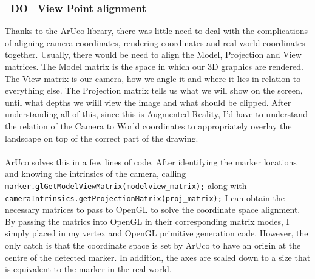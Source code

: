 \documentclass[11pt]{article}
\begin{document}
\subsubsection{~DO~ View Point alignment}
Thanks to the ArUco library, there was little need to deal with the
complications of aligning camera coordinates, rendering coordinates
and real-world coordinates together. Usually, there would be
need to align the Model, Projection and View matrices. The Model matrix
is the space in which our 3D graphics are rendered. The View matrix is
our camera, how we angle it and where it lies in relation to everything
else. The Projection matrix tells us what we will show on the screen,
until what depths we wiill view the image and what should be clipped.
After understanding all of this, since this is Augmented Reality, I'd have
to understand the relation of the Camera to World coordinates to appropriately
overlay the landscape on top of the correct part of the drawing.\\
\\
ArUco solves this in a few lines of code. After identifying the marker
locations and knowing the intrinsics of the camera, calling 
\texttt{marker.glGetModelViewMatrix(modelview\_matrix);} along with
\texttt{cameraIntrinsics.getProjectionMatrix(proj\_matrix);} I can obtain
the necessary matrices to pass to OpenGL to solve the coordinate space
alignment. By passing the matrics into OpenGL in their corresponding
matrix modes, I simply placed in my vertex and OpenGL primitive generation code.
However, the only catch is that the coordinate space is set by ArUco to have
an origin at the centre of the detected marker. In addition, the axes are 
scaled down to a size that is equivalent to the marker in the real world.\\
\\
\end{document}
